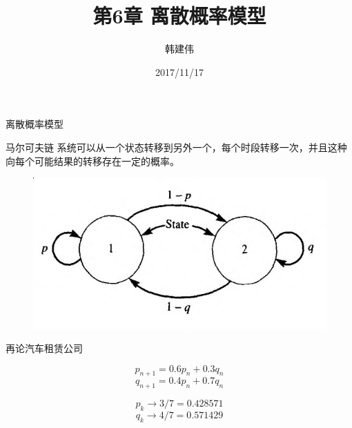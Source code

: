 \documentclass[mathserif, table]{beamer}
\title{第6章 离散概率模型}
\author{韩建伟}
\institute{
  信息学院\\
  \texttt{mm@hanjianwei.com}
}
\date{2017/11/17}
\begin{document}
\begin{frame}[plain]
  \titlepage{}
\end{frame}

\begin{frame}{离散概率模型}

  \begin{block}{马尔可夫链}
    系统可以从一个状态转移到另外一个，每个时段转移一次，并且这种向每个可能结果的转移存在一定的概率。
  \end{block}

  \begin{figure}
    \centering
    \includegraphics[width=0.6\textwidth{}]{markov.png}
  \end{figure}

\end{frame}

\begin{frame}{再论汽车租赁公司}
  \begin{figure}
    \centering
  \end{figure}

  \[
  p_{n+1} = 0.6p_n + 0.3q_n
  \]
  \[
  q_{n+1} = 0.4p_n + 0.7q_n
  \]

  \[
  p_k \rightarrow 3/7 = 0.428571
  \]
  \[
  q_k \rightarrow 4/7 = 0.571429
  \]
\end{frame}
\end{document}
